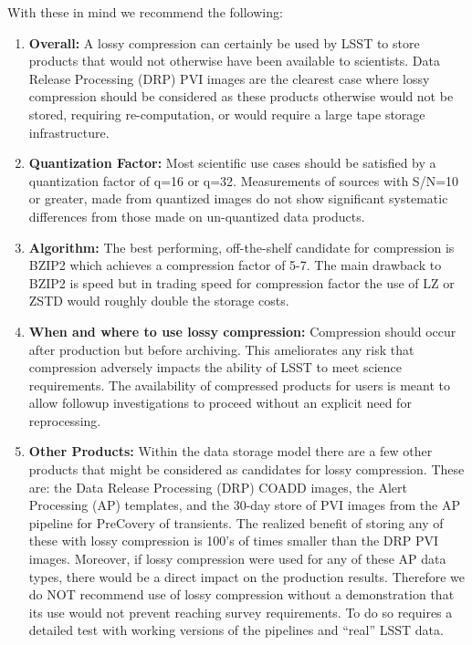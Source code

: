 With these in mind we recommend the following:
\begin{enumerate}
\item {\bf Overall:} A lossy compression can certainly be used by LSST to store products that would 
not otherwise have been available to scientists. Data Release Processing (DRP) PVI images are the 
clearest case where lossy compression should be considered as these products otherwise would not be stored, 
requiring re-computation, or would require a large tape storage infrastructure. 

\item {\bf Quantization Factor:} Most scientific use cases should be satisfied by a quantization 
factor of q=16 or q=32.  Measurements of sources with S/N=10 or greater, made from quantized images 
do not show significant systematic differences from those made on un-quantized data products.  

\item {\bf Algorithm:} The best performing, off-the-shelf candidate for compression is BZIP2 which 
achieves a compression factor of 5-7.  The main drawback to BZIP2 is speed but in trading speed for 
compression factor the use of LZ or ZSTD would roughly double the storage costs.  

\item {\bf When and where to use lossy compression:}  Compression should occur after production
but before archiving.  This ameliorates any risk that compression adversely impacts the ability 
of LSST to meet science requirements.  The availability of compressed products for
users is meant to allow followup investigations to proceed without an explicit need for reprocessing.  

\item {\bf Other Products:} Within the data storage model there are a few other products that 
might be considered as candidates for lossy compression.  These are: the Data Release Processing
(DRP) COADD images, the Alert Processing (AP) templates, and the 30-day store of PVI images from 
the AP pipeline for PreCovery of transients.  The realized benefit of storing any of these with 
lossy compression is 100's of times smaller than the DRP PVI images.  Moreover, if lossy compression 
were used for any of these AP data types, there would be a direct impact on the production results.  
Therefore we do NOT recommend use of lossy compression without a demonstration that its use would 
not prevent reaching survey requirements.  To do so requires a detailed test with working versions
of the pipelines and ``real'' LSST data. 


\end{enumerate}
